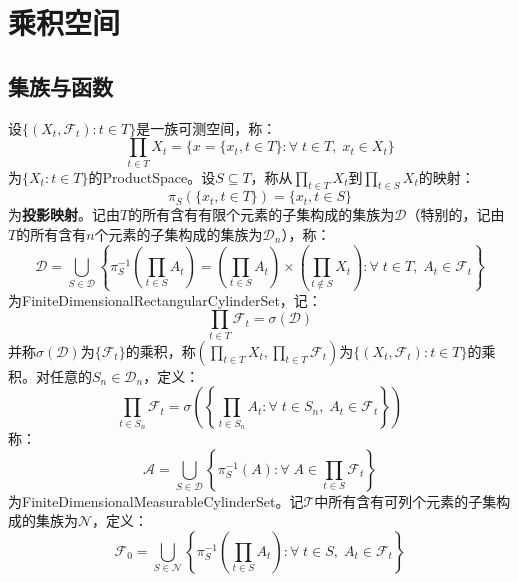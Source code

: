 \section{乘积空间}

\subsection{集族与函数}

\begin{definition}
	设$\{(X_t,\mathscr{F}_t):t\in T\}$是一族可测空间，称：
	\begin{equation*}
		\prod_{t\in T}X_t=\Big\{x=\{x_t,t\in T\}:\forall\;t\in T,\;x_t\in X_t\Big\}
	\end{equation*}
	为$\{X_t:t\in T\}$的\gls{ProductSpace}。设$S\subseteq T$，称从$\prod\limits_{t\in T}X_t$到$\prod\limits_{t\in S}X_t$的映射：
	\begin{equation*}
		\pi_S(\{x_t,t\in T\})=\{x_t,t\in S\}
	\end{equation*}
	为\textbf{投影映射}。记由$T$的所有含有有限个元素的子集构成的集族为$\mathcal{D}$（特别的，记由$T$的所有含有$n$个元素的子集构成的集族为$\mathcal{D}_n$），称：
	\begin{equation*}
		\mathscr{D}=\underset{S\in\mathcal{D}}{\overset{}{\bigcup}}\left\{\pi_S^{-1}\left(\prod_{t\in S}A_t\right)=\left(\prod_{t\in S}A_t\right)\times\left(\prod_{t\notin S}X_t\right):\forall\;t\in T,\;A_t\in\mathscr{F}_t\right\}
	\end{equation*}
	为\gls{FiniteDimensionalRectangularCylinderSet}，记：
	\begin{equation*}
		\prod_{t\in T}\mathscr{F}_t=\sigma(\mathscr{D})
	\end{equation*}
	并称$\sigma(\mathscr{D})$为$\{\mathscr{F}_t\}$的乘积，称$\left(\prod\limits_{t\in T}X_t,\prod\limits_{t\in T}\mathscr{F}_t\right)$为$\{(X_t,\mathscr{F}_t):t\in T\}$的乘积。对任意的$S_n\in\mathcal{D}_n$，定义：
	\begin{equation*}
		\prod_{t\in S_n}\mathscr{F}_t=\sigma\left(\left\{\prod_{t\in S_n}A_t:\forall\;t\in S_n,\;A_t\in\mathscr{F}_t\right\}\right)
	\end{equation*}
	称：
	\begin{equation*}
		\mathscr{A}=\underset{S\in\mathcal{D}}{\overset{}{\bigcup}}\left\{\pi_S^{-1}(A):\forall\;A\in\prod_{t\in S}\mathscr{F}_t\right\}
	\end{equation*}
	为\gls{FiniteDimensionalMeasurableCylinderSet}。记$\mathcal{T}$中所有含有可列个元素的子集构成的集族为$\mathcal{N}$，定义：
	\begin{equation*}
		\mathscr{F}_0=\underset{S\in\mathcal{N}}{\overset{}{\bigcup}}\left\{\pi_S^{-1}\left(\prod_{t\in S}A_t\right):\forall\;t\in S,\;A_t\in\mathscr{F}_t\right\}
	\end{equation*}
\end{definition}
